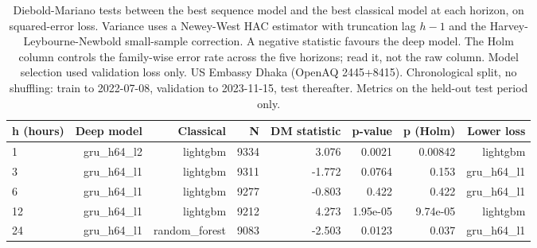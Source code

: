 \begin{table}[htbp]
\caption{Diebold-Mariano tests between the best sequence model and the best classical model at each horizon, on squared-error loss. Variance uses a Newey-West HAC estimator with truncation lag $h-1$ and the Harvey-Leybourne-Newbold small-sample correction. A negative statistic favours the deep model. The Holm column controls the family-wise error rate across the five horizons; read it, not the raw column. Model selection used validation loss only. US Embassy Dhaka (OpenAQ 2445+8415). Chronological split, no shuffling: train to 2022-07-08, validation to 2023-11-15, test thereafter. Metrics on the held-out test period only.}
\label{tab:diebold_mariano}
\begin{tabular}{lrrrrrrr}
\toprule
h (hours) & Deep model & Classical & N & DM statistic & p-value & p (Holm) & Lower loss \\
\midrule
1 & gru\_h64\_l2 & lightgbm & 9334 & 3.076 & 0.0021 & 0.00842 & lightgbm \\
3 & gru\_h64\_l1 & lightgbm & 9311 & -1.772 & 0.0764 & 0.153 & gru\_h64\_l1 \\
6 & gru\_h64\_l1 & lightgbm & 9277 & -0.803 & 0.422 & 0.422 & gru\_h64\_l1 \\
12 & gru\_h64\_l1 & lightgbm & 9212 & 4.273 & 1.95e-05 & 9.74e-05 & lightgbm \\
24 & gru\_h64\_l1 & random\_forest & 9083 & -2.503 & 0.0123 & 0.037 & gru\_h64\_l1 \\
\bottomrule
\end{tabular}
\end{table}
